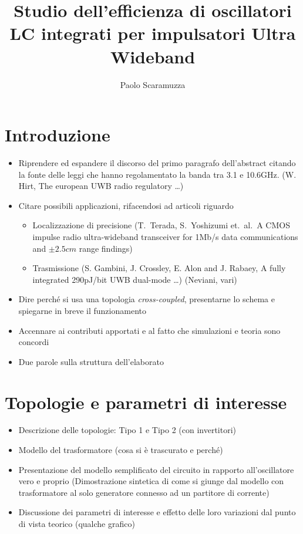 \documentclass[a4paper]{article}
\author{Paolo Scaramuzza}
\title{Studio dell'efficienza di oscillatori LC integrati per impulsatori 
	Ultra Wideband}
\date{} %
\begin{document}
\maketitle

\section{Introduzione}
\begin{itemize}
	\item Riprendere ed espandere il discorso del primo paragrafo
		dell'abstract citando la fonte delle leggi che hanno regolamentato
		la banda tra 3.1 e 10.6GHz.
		(W. Hirt, The european UWB radio regulatory \ldots)
	
	\item Citare possibili applicazioni, rifacendosi ad articoli riguardo
	\begin{itemize}
		\item Localizzazione di precisione (T.\ Terada, S.\ Yoshizumi et.\
			al.\, A CMOS impulse radio ultra-wideband transceiver for
			1Mb/s data communications and $\pm 2.5cm$ range findings)
		\item Trasmissione (S. Gambini, J. Crossley, E. Alon and J. Rabaey,
			A fully integrated 290pJ/bit UWB dual-mode \ldots)
			(Neviani, vari)
	\end{itemize}

	\item Dire perché si usa una topologia \emph{cross-coupled}, presentarne
		lo schema e spiegarne in breve il funzionamento
	\item Accennare ai contributi apportati e al fatto che simulazioni e
		teoria sono concordi
	\item Due parole sulla struttura dell'elaborato
\end{itemize}
\section{Topologie e parametri di interesse}
\begin{itemize}
	\item Descrizione delle topologie: Tipo 1 e Tipo 2 (con invertitori)
	\item Modello del trasformatore (cosa si è trascurato e perché)
	\item Presentazione del modello semplificato del circuito in rapporto 	
		all'oscillatore vero e proprio (Dimostrazione sintetica di come si
		giunge dal modello con trasformatore al solo generatore connesso ad
		un partitore di corrente)
	\item Discussione dei parametri di interesse e effetto delle
		loro variazioni dal punto di vista teorico (qualche grafico)
\end{itemize}
\end{document}
